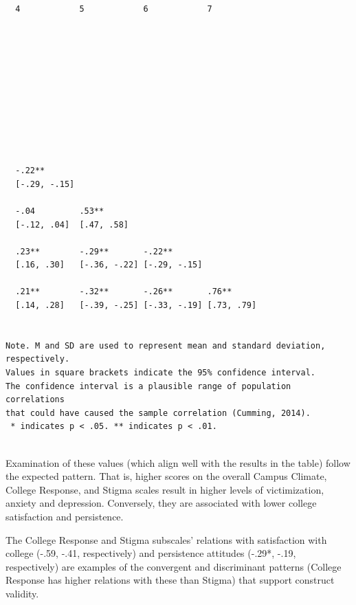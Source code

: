 \documentclass[
  english,
]{book}
\begin{document}
\begin{verbatim}
  4            5            6            7         
                                                   
                                                   
                                                   
                                                   
                                                   
                                                   
                                                   
                                                   
                                                   
                                                   
                                                   
  -.22**                                           
  [-.29, -.15]                                     
                                                   
  -.04         .53**                               
  [-.12, .04]  [.47, .58]                          
                                                   
  .23**        -.29**       -.22**                 
  [.16, .30]   [-.36, -.22] [-.29, -.15]           
                                                   
  .21**        -.32**       -.26**       .76**     
  [.14, .28]   [-.39, -.25] [-.33, -.19] [.73, .79]
                                                   

Note. M and SD are used to represent mean and standard deviation, respectively.
Values in square brackets indicate the 95% confidence interval.
The confidence interval is a plausible range of population correlations 
that could have caused the sample correlation (Cumming, 2014).
 * indicates p < .05. ** indicates p < .01.
 
\end{verbatim}

Examination of these values (which align well with the results in the table) follow the expected pattern. That is, higher scores on the overall Campus Climate, College Response, and Stigma scales result in higher levels of victimization, anxiety and depression. Conversely, they are associated with lower college satisfaction and persistence.

The College Response and Stigma subscales' relations with satisfaction with college (-.59, -.41, respectively) and persistence attitudes (-.29*, -.19, respectively) are examples of the convergent and discriminant patterns (College Response has higher relations with these than Stigma) that support construct validity.
\end{document}
